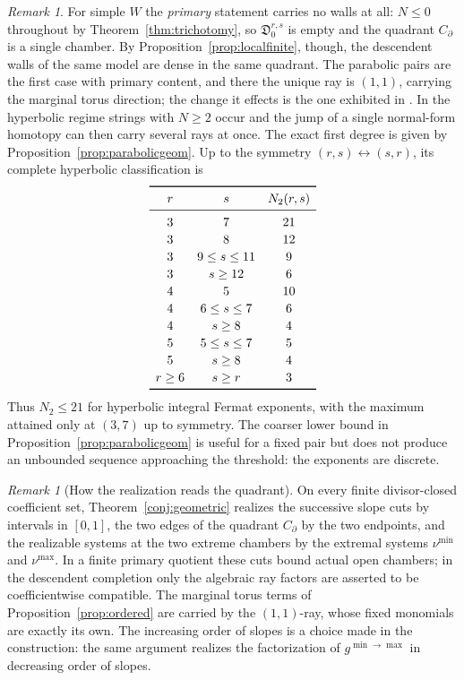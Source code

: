 \documentclass[11pt]{amsart}
\theoremstyle{definition}
\theoremstyle{remark}
\newtheorem{remark}[theorem]{Remark}
\newcommand{\Dscr}{\mathfrak{D}}
\begin{document}
\begin{remark}
\label{rem:thresholdgeom}
For simple $W$ the \emph{primary} statement carries no walls at all: $N\le0$
throughout by Theorem~\ref{thm:trichotomy}, so $\Dscr^{r,s}_{0}$ is empty and
the quadrant $C_\partial$ is a single chamber. By
Proposition~\ref{prop:localfinite}, though, the descendent walls of the same
model are dense in the same quadrant. The parabolic pairs are the first
case with primary content, and there the unique
ray is $(1,1)$, carrying the marginal torus direction; the change it effects is
the one exhibited in \cite[Ex.~4.9]{GKTsurvey}. In the hyperbolic regime strings
with $N\ge2$ occur and the jump of a single normal-form homotopy can then carry
several rays at once.
The exact first degree is given by Proposition~\ref{prop:parabolicgeom}.
Up to the symmetry $(r,s)\leftrightarrow(s,r)$, its complete hyperbolic
classification is
\[
\renewcommand{\arraystretch}{1.15}
\begin{array}{ccc}
\toprule
r&s&N_2(r,s)\\
\midrule
3&7&21\\
3&8&12\\
3&9\le s\le11&9\\
3&s\ge12&6\\
4&5&10\\
4&6\le s\le7&6\\
4&s\ge8&4\\
5&5\le s\le7&5\\
5&s\ge8&4\\
r\ge6&s\ge r&3\\
\bottomrule
\end{array}
\]
Thus $N_2\le21$ for hyperbolic integral Fermat exponents, with the maximum attained only
at $(3,7)$ up to symmetry. The coarser lower bound in
Proposition~\ref{prop:parabolicgeom} is useful for a fixed pair but does not
produce an unbounded sequence approaching the threshold: the exponents are
discrete.
\end{remark}

\begin{remark}[How the realization reads the quadrant]
\label{rem:conjform}
On every finite divisor-closed coefficient set,
Theorem~\ref{conj:geometric} realizes the successive slope cuts by intervals
in $[0,1]$, the two edges of the quadrant $C_\partial$ by the two endpoints,
and the realizable systems at the two extreme chambers by the extremal systems
$\nu^{\min}$ and $\nu^{\max}$.  In a finite primary
quotient these cuts bound actual open chambers; in the descendent completion
only the algebraic ray factors are asserted to be coefficientwise compatible.
The marginal torus terms of
Proposition~\ref{prop:ordered} are carried by the $(1,1)$-ray, whose fixed
monomials are exactly its own.  The increasing order of slopes is a choice made in the construction: the same argument realizes the factorization of
$g^{\min\to\max}$ in decreasing order of slopes.
\end{remark}
\end{document}
